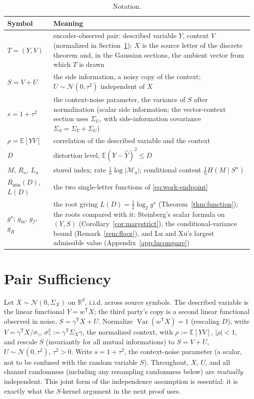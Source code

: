 \documentclass[11pt,onecolumn]{IEEEtran}
\newcommand{\E}{\mathbb{E}}
\newcommand{\R}{\mathbb{R}}
\newcommand{\hY}{\widehat{Y}}
\begin{document}
\begin{table}[!t]
\caption{Notation.}
\label{tab:notation}
\centering
\footnotesize
\begin{tabular}{p{1.35in}p{4.55in}}
\hline
Symbol & Meaning\\
\hline
$T=(Y,V)$ & encoder-observed pair: described variable $Y$, context $V$
(normalized in Section~\ref{sec:pair}); $X$ is the source letter of the
discrete theorem and, in the Gaussian sections, the ambient vector from
which $T$ is drawn\\
$S=V+U$ & the side information, a noisy copy of the context; $U\sim\mathcal N(0,\tau^2)$
independent of $X$\\
$s=1+\tau^2$ & the context-noise parameter, the variance of $S$ after
normalization (scalar side information;
the vector-context section uses $\Sigma_U$, with side-information
covariance $\Sigma_S=\Sigma_V+\Sigma_U$)\\
$\rho=\E[YV]$ & correlation of the described variable and the context\\
$D$ & distortion level, $\E(Y-\hY)^2\le D$\\
$M$, $R_n$, $L_n$ & stored index; rate $\tfrac1n\log|\mathcal M_n|$;
conditional content $\tfrac1n H(M\mid S^n)$\\
$R_{\min}(D)$, $L(D)$ & the two single-letter functions of
\eqref{eq:work-endpoint}\\
$g^\star$; $g_{\mathrm m}$, $g_f$, $g_R$ & the root giving
$L(D)=\tfrac12\log_2 g^\star$ (Theorem~\ref{thm:function}); the roots
compared with it: Steinberg's scalar formula on $(Y,S)$
(Corollary~\ref{cor:margstrict}), the conditional-variance bound
(Remark~\ref{rem:floor}), and Lu and Xu's largest admissible value
(Appendix~\ref{app:lucompare})\\
\hline
\end{tabular}
\end{table}

\section{Pair Sufficiency}
\label{sec:pair}

Let $X\sim\mathcal N(0,\Sigma_X)$ on $\R^d$, i.i.d. across source symbols.
The described variable is the linear functional $Y=w^{\mathsf T}X$; the third
party's copy is a second linear functional observed in noise,
$S=\gamma^{\mathsf T}X+U$. Normalize
$\operatorname{Var}(w^{\mathsf T}X)=1$ (rescaling $D$), write
$V=\gamma^{\mathsf T}X/\sigma_{\gamma}$, $\sigma_\gamma^2:=\gamma^{\mathsf T}\Sigma_X\gamma$,
the normalized context, with
$\rho:=\E[YV]$, $|\rho|<1$, and
rescale $S$ (invariantly for all mutual informations) to $S=V+U$,
$U\sim\mathcal N(0,\tau^2)$, $\tau^2>0$. Write $s=1+\tau^2$, the
context-noise parameter (a scalar, not to be confused with the random
variable $S$). Throughout,
$X$, $U$, and all channel randomness (including any resampling randomness
below) are \emph{mutually} independent. This joint form of the independence
assumption is essential: it is exactly what the $S$-kernel argument in
the next proof uses.
\end{document}
